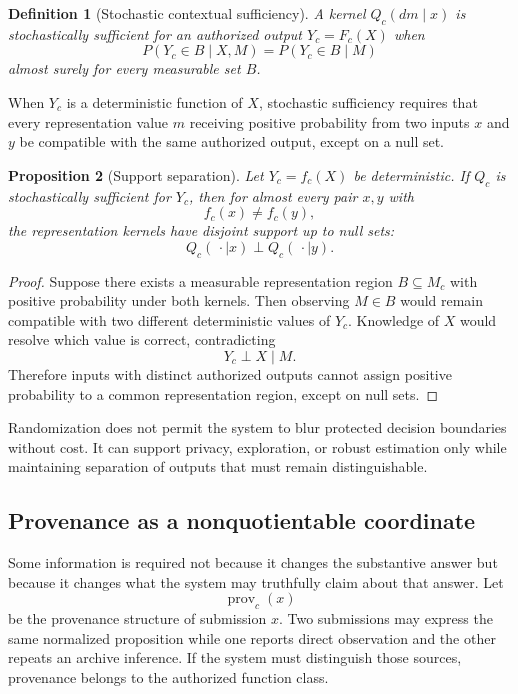 \documentclass[11pt]{article}
\newtheorem{definition}{Definition}[section]
\newtheorem{proposition}[definition]{Proposition}
\theoremstyle{definition}
\begin{document}
\begin{definition}[Stochastic contextual sufficiency]
A kernel \(Q_c(dm\mid x)\) is stochastically sufficient for an authorized output \(Y_c=F_c(X)\) when
\[
P(Y_c\in B\mid X,M)
=
P(Y_c\in B\mid M)
\]
almost surely for every measurable set \(B\).
\end{definition}

When \(Y_c\) is a deterministic function of \(X\), stochastic sufficiency requires that every representation value \(m\) receiving positive probability from two inputs \(x\) and \(y\) be compatible with the same authorized output, except on a null set.

\begin{proposition}[Support separation]
Let \(Y_c=f_c(X)\) be deterministic. If \(Q_c\) is stochastically sufficient for \(Y_c\), then for almost every pair \(x,y\) with
\[
f_c(x)\neq f_c(y),
\]
the representation kernels have disjoint support up to null sets:
\[
Q_c(\,\cdot\mid x)
\perp
Q_c(\,\cdot\mid y).
\]
\end{proposition}

\begin{proof}
Suppose there exists a measurable representation region \(B\subseteq M_c\) with positive probability under both kernels. Then observing \(M\in B\) would remain compatible with two different deterministic values of \(Y_c\). Knowledge of \(X\) would resolve which value is correct, contradicting
\[
Y_c\perp X\mid M.
\]
Therefore inputs with distinct authorized outputs cannot assign positive probability to a common representation region, except on null sets.
\end{proof}

Randomization does not permit the system to blur protected decision boundaries without cost. It can support privacy, exploration, or robust estimation only while maintaining separation of outputs that must remain distinguishable.

\subsection{Provenance as a nonquotientable coordinate}

Some information is required not because it changes the substantive answer but because it changes what the system may truthfully claim about that answer. Let
\[
\operatorname{prov}_c(x)
\]
be the provenance structure of submission \(x\). Two submissions may express the same normalized proposition while one reports direct observation and the other repeats an archive inference. If the system must distinguish those sources, provenance belongs to the authorized function class.
\end{document}
